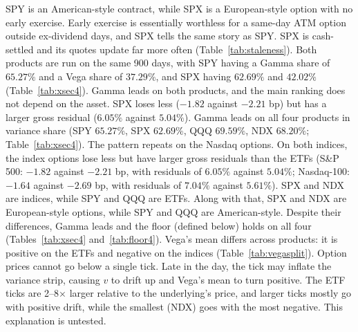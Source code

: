 \documentclass[11pt]{article}
\begin{document}
SPY is an American-style contract, while SPX is a European-style option with no early exercise. Early exercise is essentially worthless for a same-day ATM option outside ex-dividend days, and SPX tells the same story as SPY. SPX is cash-settled and its quotes update far more often (Table~\ref{tab:staleness}). Both products are run on the same 900 days, with SPY having a Gamma share of $65.27\%$ and a Vega share of $37.29\%$, and SPX having $62.69\%$ and $42.02\%$ (Table~\ref{tab:xsec4}). Gamma leads on both products, and the main ranking does not depend on the asset. SPX loses less ($-1.82$ against $-2.21$ bp) but has a larger gross residual ($6.05\%$ against $5.04\%$). Gamma leads on all four products in variance share (SPY $65.27\%$, SPX $62.69\%$, QQQ $69.59\%$, NDX $68.20\%$; Table~\ref{tab:xsec4}). The pattern repeats on the Nasdaq options. On both indices, the index options lose less but have larger gross residuals than the ETFs (S\&P 500: $-1.82$ against $-2.21$ bp, with residuals of $6.05\%$ against $5.04\%$; Nasdaq-100: $-1.64$ against $-2.69$ bp, with residuals of $7.04\%$ against $5.61\%$). SPX and NDX are indices, while SPY and QQQ are ETFs. Along with that, SPX and NDX are European-style options, while SPY and QQQ are American-style. Despite their differences, Gamma leads and the floor (defined below) holds on all four (Tables~\ref{tab:xsec4} and~\ref{tab:floor4}). Vega's mean differs across products: it is positive on the ETFs and negative on the indices (Table~\ref{tab:vegasplit}). Option prices cannot go below a single tick. Late in the day, the tick may inflate the variance strip, causing $v$ to drift up and Vega's mean to turn positive. The ETF ticks are 2--8$\times$ larger relative to the underlying's price, and larger ticks mostly go with positive drift, while the smallest (NDX) goes with the most negative. This explanation is untested.
\end{document}
